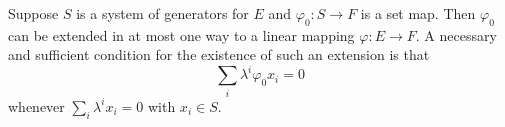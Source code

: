 Suppose $S$ is a system of generators for $E$ and $\varphi_0: S \to F$ is a set map. Then $\varphi_0$ can be extended in at most one way to a linear mapping $\varphi: E \to F$. A necessary and sufficient condition for the existence of such an extension is that
$$\sum_i \lambda^i \varphi_0 x_i = 0$$
whenever $\sum_i \lambda^i x_i = 0$ with $x_i \in S$.
